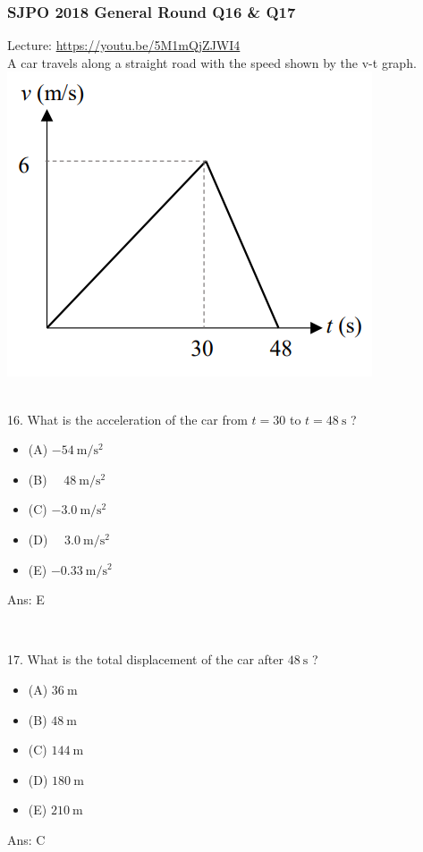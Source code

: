 \documentclass{article}
\begin{document}
\subsubsection{SJPO 2018 General Round Q16 \& Q17}
Lecture: \url{https://youtu.be/5M1mQjZJWI4} \\[10pt]
A car travels along a straight road with the speed shown by the 
v-t graph. \\ \includegraphics[width=0.5\linewidth]{images/2018q16.png} \\
\\
\begin{samepage}
16. What is the acceleration of the car from $t=30$ to $t=48 \mathrm{~s}$ ?
\begin{itemize}
\item[] (A) $-54 \mathrm{~m} / \mathrm{s}^2$ 
\item[] (B) $\quad 48 \mathrm{~m} / \mathrm{s}^2$ 
\item[] (C) $-3.0 \mathrm{~m} / \mathrm{s}^2$ 
\item[] (D) $\quad 3.0 \mathrm{~m} / \mathrm{s}^2$
\item[] (E) $-0.33 \mathrm{~m} / \mathrm{s}^2$\end{itemize}
Ans: \ifpaper E \fi
\end{samepage}
\\[20pt]
\begin{samepage}
17. What is the total displacement of the car after $48 \mathrm{~s}$ ?
\begin{itemize}
\item[] (A) $36 \mathrm{~m}$
\item[] (B) $48 \mathrm{~m}$
\item[] (C) $144 \mathrm{~m}$
\item[] (D) $180 \mathrm{~m}$
\item[] (E) $210 \mathrm{~m}$ 
\end{itemize}
Ans: \ifpaper C \fi\\
\end{samepage}
\end{document}
